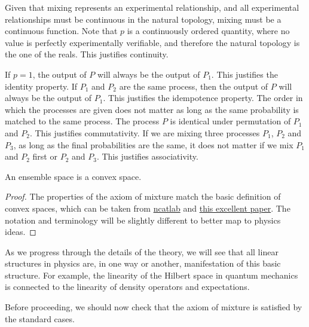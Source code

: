 \begin{mathSection}
\begin{justification}
	Given that mixing represents an experimental relationship, and all experimental relationships must be continuous in the natural topology, mixing must be a continuous function. Note that $p$ is a continuously ordered quantity, where no value is perfectly experimentally verifiable, and therefore the natural topology is the one of the reals. This justifies continuity.

	If $p=1$, the output of $P$ will always be the output of $P_1$. This justifies the identity property. If $P_1$ and $P_2$ are the same process, then the output of $P$ will always be the output of $P_1$. This justifies the idempotence property. The order in which the processes are given does not matter as long as the same probability is matched to the same process. The process $P$ is identical under permutation of $P_1$ and $P_2$. This justifies commutativity. If we are mixing three processes $P_1$, $P_2$ and $P_3$, as long as the final probabilities are the same, it does not matter if we mix $P_1$ and $P_2$ first or $P_2$ and $P_3$. This justifies associativity.
\end{justification}

\begin{coro}
	An ensemble space is a convex space.
\end{coro}

\begin{proof}
	The properties of the axiom of mixture match the basic definition of convex spaces, which can be taken from \href{https://ncatlab.org/nlab/show/convex+space}{ncatlab} and \href{https://arxiv.org/abs/0903.5522}{this excellent paper}.  The notation and terminology will be slightly different to better map to physics ideas. 
\end{proof}

\end{mathSection}

As we progress through the details of the theory, we will see that all linear structures in physics are, in one way or another, manifestation of this basic structure. For example, the linearity of the Hilbert space in quantum mechanics is connected to the linearity of density operators and expectations. 

Before proceeding, we should now check that the axiom of mixture is satisfied by the standard cases.

